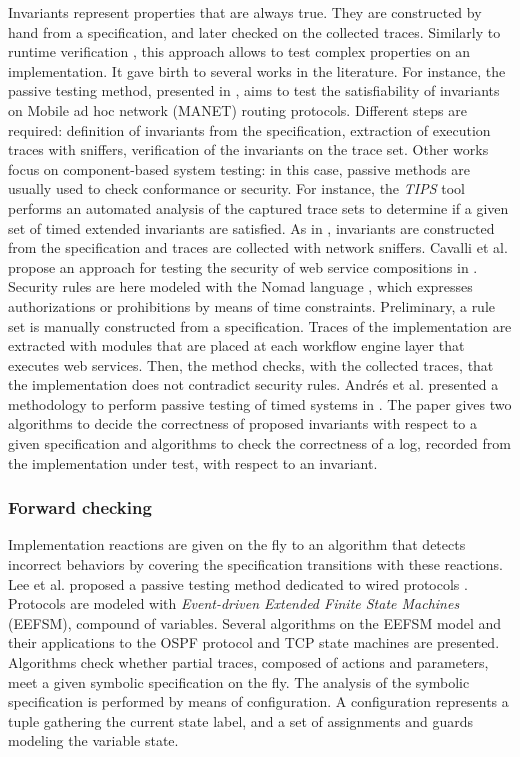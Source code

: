 Invariants represent properties that are always true. They are
constructed by hand from a specification, and later checked on
the collected traces. Similarly to runtime verification
\cite{Leucker2009293}, this approach allows to test complex
properties on an implementation. It gave birth to several works
in the literature. For instance, the passive testing method,
presented in \cite{CMdO09}, aims to test the satisfiability of
invariants on Mobile ad hoc network (MANET) routing protocols.
Different steps are required: definition of invariants from the
specification, extraction of execution traces with sniffers,
verification of the invariants on the trace set. Other works
focus on component-based system testing: in this case, passive
methods are usually used to check conformance or security. For
instance, the \textit{TIPS} tool \cite{5552735} performs an
automated analysis of the captured trace sets to determine if a
given set of timed extended invariants are satisfied. As in
\cite{CMdO09}, invariants are constructed from the specification
and traces are collected with network sniffers. Cavalli et al.
propose an approach for testing the security of web service
compositions in \cite{cavalli2009passive}. Security rules are
here modeled with the Nomad language \cite{cuppens2005nomad},
which expresses authorizations or prohibitions by means of
time constraints. Preliminary, a rule set is manually
constructed from a specification. Traces of the implementation
are extracted with modules that are placed at each workflow
engine layer that executes web services. Then, the method checks,
with the collected traces, that the implementation does not
contradict security rules. Andrés et al. presented a methodology
to perform passive testing of timed systems in
\cite{andres2012formal}. The paper gives two algorithms to decide
the correctness of proposed invariants with respect to a given
specification and algorithms to check the correctness of a log,
recorded from the implementation under test, with respect to an
invariant.

\subsubsection{Forward checking}

Implementation reactions are given on the fly to an algorithm
that detects incorrect behaviors by covering the specification
transitions with these reactions. Lee et al. proposed a passive
testing method dedicated to wired protocols \cite{1621118}.
Protocols are modeled with \textit{Event-driven Extended Finite
State Machines} (EEFSM), compound of variables.  Several
algorithms on the EEFSM model and their applications to the OSPF
protocol and TCP state machines are presented. Algorithms check
whether partial traces, composed of actions and parameters, meet
a given symbolic specification on the fly. The analysis of the
symbolic specification is performed by means of configuration. A
configuration represents a tuple gathering the current state
label, and a set of assignments and guards modeling the variable
state.

